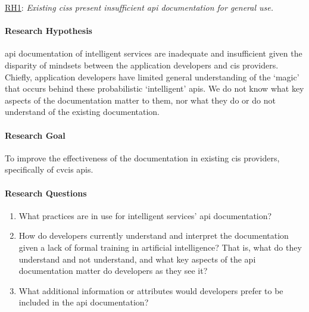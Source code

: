 \begin{titled-frame}{\underline{RH1}: \textit{Existing \glspl{cis} present insufficient \gls{api} documentation for general use.} }
\vspace{-12pt}
\paragraph{Research Hypothesis}
\gls{api} documentation of intelligent services are inadequate and insufficient given the disparity of mindsets between the application developers and \gls{cis} providers. Chiefly, application developers have limited general understanding of the `magic' that occurs behind these probabilistic `intelligent' \glspl{api}. We do not know what key aspects of the documentation matter to them, nor what they do or do not understand of the existing documentation.

\paragraph{Research Goal}
To improve the effectiveness of the documentation in existing \gls{cis} providers, specifically of \gls{cvcis} \glspl{api}.

\paragraph{Research Questions}
\begin{enumerate}[label=\textbf{RQ1.\arabic*.}, ref=RQ1.\arabic*, leftmargin=3.5\parindent, rightmargin=1\parindent]
  \item What practices are in use for intelligent services' \gls{api} documentation? 
  \label{rqs:apidoc:what-is-in-use}
  
  \item How do developers currently understand and interpret the documentation given a lack of formal training in artificial intelligence? That is, what do they understand and not understand, and what key aspects of the \gls{api} documentation matter do developers as they see it?
  \label{rqs:apidoc:how-do-devs-understand-it}
  
  \item What additional information or attributes would developers prefer to be included in the \gls{api} documentation?
  \label{rqs:apidoc:what-additional-information-needed}
\end{enumerate}


\end{titled-frame}
